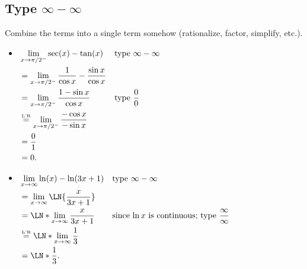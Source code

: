 \subsection*{Type $ \infty-\infty$}
Combine the terms into a single term somehow (rationalize, factor, simplify, etc.).
\begin{Example}{}{}
    \begin{itemize}
        \item $ \begin{aligned}[t]
                       & \lim\limits_{{x} \to {\pi/2^-}}\sec(x)-\tan(x)                         &  & \text{type }\infty-\infty \\
                       & =\lim\limits_{{x} \to {\pi/2^-}}\frac{1}{\cos x}-\frac{\sin x}{\cos x}                                \\
                       & =\lim\limits_{{x} \to {\pi/2^-}}\frac{1-\sin x}{\cos x}                &  & \text{type }\frac{0}{0}   \\
                       & \stackrel{\text{\tiny L'R}}{=} \lim\limits_{{x} \to {\pi/2^-}}\frac{-\cos x}{-\sin x}                                           \\
                       & =\frac{0}{1}                                                                                          \\
                       & =0.
                  \end{aligned} $
        \item $\begin{aligned}[t]
                       & \lim\limits_{{x} \to {\infty}}\ln(x)-\ln(3x+1)      &  & \text{type }\infty-\infty                                      \\
                       & =\lim\limits_{{x} \to {\infty}}\LN{\frac{x}{3x+1}}                                                                      \\
                       & =\LN*{\lim\limits_{{x} \to {\infty}}\frac{x}{3x+1}} &  & \text{since $\ln x$ is continuous; type }\frac{\infty}{\infty} \\
                       & \LHR\LN*{\lim\limits_{{x} \to {\infty}}\frac{1}{3}}                                                                     \\
                       & =\LN*{\frac{1}{3}}.
                  \end{aligned}$
    \end{itemize}
\end{Example}
